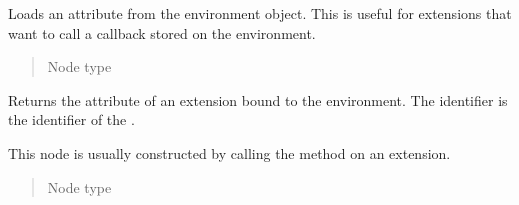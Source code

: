 \documentclass[a4paper,10pt,english]{sphinxmanual}
\begin{document}

\begin{fulllineitems}
\label{extensions:jinja2.nodes.EnvironmentAttribute}
Loads an attribute from the environment object.  This is useful for
extensions that want to call a callback stored on the environment.
\begin{quote}\begin{description}
\item[{Node type}] \leavevmode
{\hyperref[extensions:jinja2.nodes.Expr]{}}

\end{description}\end{quote}

\end{fulllineitems}


\begin{fulllineitems}
\label{extensions:jinja2.nodes.ExtensionAttribute}
Returns the attribute of an extension bound to the environment.
The identifier is the identifier of the .

This node is usually constructed by calling the
{\hyperref[extensions:jinja2.ext.Extension.attr]{}} method on an extension.
\begin{quote}\begin{description}
\item[{Node type}] \leavevmode
{\hyperref[extensions:jinja2.nodes.Expr]{}}

\end{description}\end{quote}

\end{fulllineitems}

\end{document}
